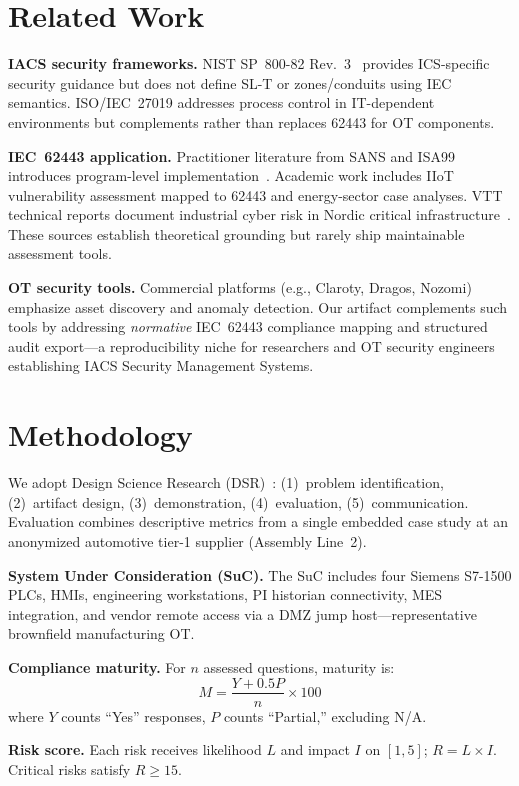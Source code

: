 \documentclass[conference]{IEEEtran}
\begin{document}
\section{Related Work}
\textbf{IACS security frameworks.} NIST SP~800-82 Rev.~3~\cite{stouffer2023nist825} provides ICS-specific security guidance but does not define SL-T or zones/conduits using IEC semantics. ISO/IEC~27019 addresses process control in IT-dependent environments but complements rather than replaces 62443 for OT components.

\textbf{IEC~62443 application.} Practitioner literature from SANS and ISA99 introduces program-level implementation~\cite{isa99intro}. Academic work includes IIoT vulnerability assessment mapped to 62443 and energy-sector case analyses. VTT technical reports document industrial cyber risk in Nordic critical infrastructure~\cite{vtt2018industrial}. These sources establish theoretical grounding but rarely ship maintainable assessment tools.

\textbf{OT security tools.} Commercial platforms (e.g., Claroty, Dragos, Nozomi) emphasize asset discovery and anomaly detection. Our artifact complements such tools by addressing \emph{normative} IEC~62443 compliance mapping and structured audit export---a reproducibility niche for researchers and OT security engineers establishing IACS Security Management Systems.

\section{Methodology}
We adopt Design Science Research (DSR)~\cite{hevner2004design}: (1)~problem identification, (2)~artifact design, (3)~demonstration, (4)~evaluation, (5)~communication. Evaluation combines descriptive metrics from a single embedded case study at an anonymized automotive tier-1 supplier (Assembly Line~2).

\textbf{System Under Consideration (SuC).} The SuC includes four Siemens S7-1500 PLCs, HMIs, engineering workstations, PI historian connectivity, MES integration, and vendor remote access via a DMZ jump host---representative brownfield manufacturing OT.

\textbf{Compliance maturity.} For $n$ assessed questions, maturity is:
\begin{equation}
M = \frac{Y + 0.5P}{n} \times 100
\end{equation}
where $Y$ counts ``Yes'' responses, $P$ counts ``Partial,'' excluding N/A.

\textbf{Risk score.} Each risk receives likelihood $L$ and impact $I$ on $[1,5]$; $R = L \times I$. Critical risks satisfy $R \geq 15$.
\end{document}
